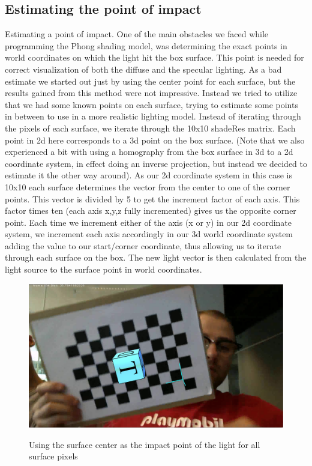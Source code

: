 \subsection{Estimating the point of impact}
Estimating a point of impact. 
One of the main obstacles we faced while programming the Phong shading model, was determining the exact points in world coordinates on which the light hit the box surface. This point is needed for correct visualization of both the diffuse and the specular lighting. As a bad estimate we started out just by using the center point for each surface, but the results gained from this method were not impressive. Instead we tried to utilize that we had some known points on each surface, trying to estimate some points in between to use in a more realistic lighting model. 
Instead of iterating through the pixels of each surface, we iterate through the 10x10 shadeRes matrix. Each point in 2d here corresponds to a 3d point on the box surface. (Note that we also experienced a bit with using a homography from the box surface in 3d to a 2d coordinate system, in effect doing an inverse projection, but instead we decided to estimate it the other way around).
As our 2d coordinate system in this case is 10x10  each surface determines the vector from the center to one of the corner points. This vector is divided by 5 to get the increment factor of each axis. This factor times ten (each axis x,y,z fully incremented) gives us the opposite corner point. Each time we increment either of the axis (x or y) in  our 2d coordinate system, we increment each axis accordingly in our 3d world coordinate system adding the value to our start/corner coordinate, thus allowing us to iterate through each surface on the box. The new light vector is then calculated from the light source to the surface point in world coordinates.

\begin{figure}[!htbp]
    \includegraphics{pics/boxCenterLightVector.png}
    \label{fig:BoxCenter}
    \caption{Using the surface center as the impact point of the light for all surface pixels}
\end{figure}

